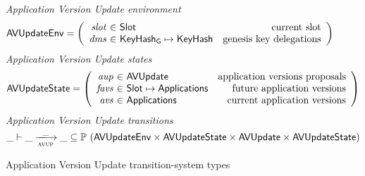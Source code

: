 \begin{figure}[htb]
  \emph{Application Version Update environment}
  \begin{equation*}
    \AVUpdateEnv =
    \left(
      \begin{array}{r@{~\in~}lr}
        \var{slot} & \Slot & \text{current slot}\\
        \var{dms} & \KeyHashGen\mapsto\KeyHash & \text{genesis key delegations} \\
      \end{array}
    \right)
  \end{equation*}
  \emph{Application Version Update states}
  \begin{equation*}
    \AVUpdateState =
    \left(
      \begin{array}{r@{~\in~}lr}
        \var{aup} & \AVUpdate & \text{application versions proposals} \\
        \var{favs} & \Slot\mapsto\Applications & \text{future application versions} \\
        \var{avs} & \Applications & \text{current application versions} \\
      \end{array}
    \right)
  \end{equation*}
  \emph{Application Version Update transitions}
  \begin{equation*}
    \_ \vdash
    \var{\_} \trans{avup}{\_} \var{\_}
    \subseteq \powerset (\AVUpdateEnv \times \AVUpdateState \times \AVUpdate \times \AVUpdateState)
  \end{equation*}
  \caption{Application Version Update transition-system types}
  \label{fig:ts-types:av-update}
\end{figure}


